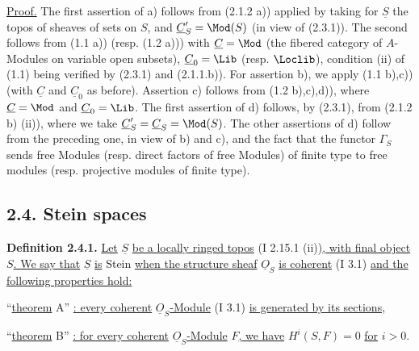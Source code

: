 \uline{Proof.} The first assertion of a) follows from (2.1.2 a)) applied by taking for $\underline{S}$ the topos of sheaves of sets on $S$, and $\underline{C}'_S=\Mod(S)$ (in view of (2.3.1)). The second follows from (1.1 a)) (resp. (1.2 a))) with $\underline{C}=\Mod$ (the fibered category of $A$-Modules on variable open subsets), $\underline{C}_0=\Lib$ (resp. $\Loclib$), condition (ii) of (1.1) being verified by (2.3.1) and (2.1.1.b)). For assertion b), we apply (1.1 b),c)) (with $\underline{C}$ and $\underline{C}_0$ as before). Assertion c) follows from (1.2 b),c),d)), where $\underline{C}=\Mod$ and $\underline{C}_0=\Lib$. The first assertion of d) follows, by (2.3.1), from (2.1.2 b) (ii)), where we take $\underline{C}'_S=\underline{C}_S=\Mod(S)$. The other assertions of d) follow from the preceding one, in view of b) and c), and the fact that the functor $\Gamma_S$ sends free Modules (resp. direct factors of free Modules) of finite type to free modules (resp. projective modules of finite type).

\subsection*{2.4. Stein spaces}

\textbf{Definition 2.4.1.} \uline{Let} $\underline{S}$ \uline{be a locally ringed topos} (I 2.15.1 (ii))\uline{, with final object} $S$\uline{. We say that} $\underline{S}$ \uline{is} Stein \uline{when the structure sheaf} $\underline{O}_S$ \uline{is coherent} (I 3.1) \uline{and the following properties hold:}

\textquotedblleft\uline{theorem} A\textquotedblright{} \uline{: every coherent} $\underline{O}_S$\uline{-Module} (I 3.1) \uline{is generated by its sections,}

\textquotedblleft\uline{theorem} B\textquotedblright{} \uline{: for every coherent} $\underline{O}_S$\uline{-Module} $F$\uline{, we have} $H^i(S,F)=0$ \uline{for} $i>0$.

